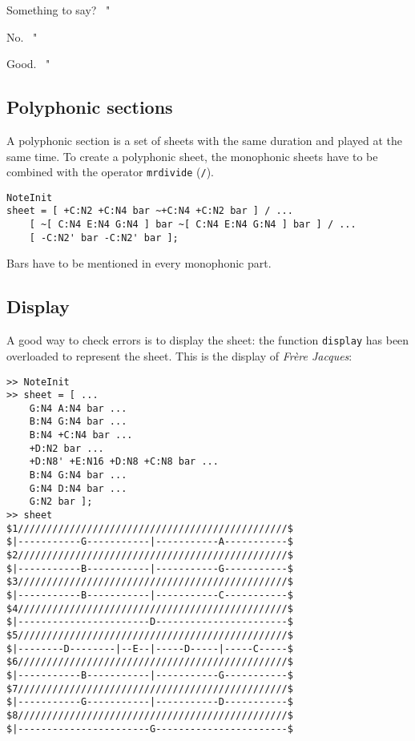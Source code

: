 \documentclass{article}
\newcommand\frerejaques{\emph{Fr\`ere Jacques}\xspace}
\newenvironment{meenv}{ \par \noindent \makebox[6em][r]{ \textcolor{mecolor}{Me}: " --~}}{~"}
\newenvironment{myselfenv}{ \par \noindent \makebox[6em][r]{ \textcolor{myselfcolor}{Myself}: " --~}}{~"}
\newcommand{ \me }[1]{%
\begin{meenv}%
	#1%
\end{meenv} }
\newcommand{ \myself }[1]{%
\begin{myselfenv}%
	#1%
\end{myselfenv} }
\begin{document}
\myself{Something to say?}
\me{No.}
\myself{Good.}

\subsection{Polyphonic sections}

A polyphonic section is a set of sheets with the same duration and played at the same time. To create a polyphonic sheet, the monophonic sheets have to be combined with the operator \lstinline!mrdivide! (\lstinline!/!). \\
\begin{lstlisting}
NoteInit
sheet = [ +C:N2 +C:N4 bar ~+C:N4 +C:N2 bar ] / ...
	[ ~[ C:N4 E:N4 G:N4 ] bar ~[ C:N4 E:N4 G:N4 ] bar ] / ...
	[ -C:N2' bar -C:N2' bar ];
\end{lstlisting}

Bars have to be mentioned in every monophonic part.

\subsection{Display}

A good way to check errors is to display the sheet: the function \lstinline!display! has been overloaded to represent the sheet. This is the display of \frerejaques:
\begin{lstlisting}
>> NoteInit
>> sheet = [ ...
	G:N4 A:N4 bar ...
	B:N4 G:N4 bar ...
	B:N4 +C:N4 bar ...
	+D:N2 bar ...
	+D:N8' +E:N16 +D:N8 +C:N8 bar ...
	B:N4 G:N4 bar ...
	G:N4 D:N4 bar ...
	G:N2 bar ];
>> sheet
$1///////////////////////////////////////////////$
$|-----------G-----------|-----------A-----------$
$2///////////////////////////////////////////////$
$|-----------B-----------|-----------G-----------$
$3///////////////////////////////////////////////$
$|-----------B-----------|-----------C-----------$
$4///////////////////////////////////////////////$
$|-----------------------D-----------------------$
$5///////////////////////////////////////////////$
$|--------D--------|--E--|-----D-----|-----C-----$
$6///////////////////////////////////////////////$
$|-----------B-----------|-----------G-----------$
$7///////////////////////////////////////////////$
$|-----------G-----------|-----------D-----------$
$8///////////////////////////////////////////////$
$|-----------------------G-----------------------$
\end{lstlisting}
\end{document}

